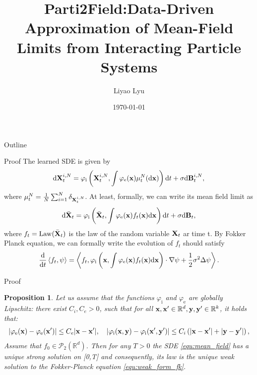 \documentclass[aspectratio=169]{beamer}
\title[Parti2Field]{Parti2Field:Data-Driven Approximation of Mean-Field Limits from Interacting Particle Systems}
\author[L. Lyu]{Liyao Lyu}
\institute[UCLA Mathematics]{Department of Mathematics \\ University of California, Los Angeles}
\date{\today}
\newtheorem{proposition}{Proposition}[section]
\begin{document}
\begin{frame}[plain]
  \titlepage
\end{frame}

\begin{frame}{Outline}
  \tableofcontents
\end{frame}
\begin{frame}{Proof}
    The learned  SDE is given by 
\begin{equation}\label{equ:N_particle}
   \begin{aligned}
    \mathrm{d} \mathbf{X}^{i,N}_t = \varphi_{\text{i}}\left(\mathbf{X}^{i,N}_t,\int  \varphi_{\text{e}}(\mathbf{x} ) \mu^N_t(\mathrm{d}\mathbf{x})\right)\mathrm{d} t + \sigma \mathrm{d} \mathbf{B}^{i,N}_t,
\end{aligned} 
\end{equation}
where $\mu_t^N = \frac{1}{N}\sum_{i=1}^N \delta_{\mathbf{X}^{i,N}_t}$. At least, formally, we can write its mean field limit as 
\begin{equation}\label{equ:mean_field}
      \begin{aligned}
    \mathrm{d} \bar{\mathbf{X}}_t = \varphi_{\text{i}}\left(\bar{\mathbf{X}}_t,\int  \varphi_{\text{e}}(\mathbf{x} ) f_t(\mathbf{x})\mathrm{d}\mathbf{x}\right)\mathrm{d} t + \sigma \mathrm{d} \mathbf{B}_t,
\end{aligned} 
\end{equation}
where $f_t = \mathrm{Law}(\bar{\mathbf{X}}_t)$ is the law of the random variable $\mathbf{X}_t$ ar time t. By Fokker Planck equation, we can formally write the evolution of $f_t$ should satisfy 
\begin{equation}\label{equ:weak_form_fk}
\frac{\mathrm{d} }{\mathrm{d} t} \left\langle f_t,\psi \right\rangle = \left\langle f_t, \varphi_{\text{i}}\left(\mathbf{x},\int  \varphi_{\text{e}}(\mathbf{x} ) f_t(\mathbf{x})\mathrm{d}\mathbf{x}\right)\cdot \nabla \psi + \frac{1}{2}\sigma^2 \Delta \psi\right\rangle.
\end{equation}
\end{frame}
\begin{frame}{Proof}
\begin{proposition}\label{prop:well-possness}
    Let us assume that the functions $ \varphi_{\text{i}}$ and $\varphi_{\text{e}}$ are globally Lipschitz: there exist $C_i,C_e>0$, such that for all $\mathbf{x},\mathbf{x}'\in \mathbb R^d , \mathbf{y},\mathbf{y}'\in \mathbb R^{k}$, it holds that:
    \[
    |\varphi_{\text{e}}(\mathbf{x})-\varphi_{\text{e}}(\mathbf{x}')|\leq C_e|\mathbf{x}-\mathbf{x}'|,\quad 
    |\varphi_{\text{i}}(\mathbf{x},\mathbf{y})-\varphi_{\text{i}}(\mathbf{x}',\mathbf{y}')|\leq C_i\left(|\mathbf{x}-\mathbf{x}'|+|\mathbf{y}-\mathbf{y}'|\right),
    \]
    Assume that $f_0\in \mathcal P_2(\mathbb R^d)$. Then for any $T>0$ the SDE \eqref{equ:mean_field} has a unique strong solution on [0,T] and consequently, its law is the unique weak solution to the Fokker-Planck equation \eqref{equ:weak_form_fk}.
\end{proposition} 
\end{frame}
\end{document}
